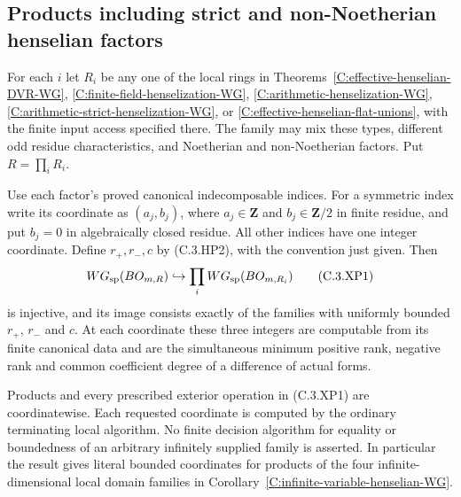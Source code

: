 \subsection{Products including strict and non-Noetherian henselian factors}
\label{C:extended-henselian-products-subsection}

\begin{theorem}
\label{C:extended-henselian-products-WG}
For each $i$ let $R_i$ be any one of the local rings in
Theorems~\ref{C:effective-henselian-DVR-WG},
\ref{C:finite-field-henselization-WG},
\ref{C:arithmetic-henselization-WG},
\ref{C:arithmetic-strict-henselization-WG}, or
\ref{C:effective-henselian-flat-unions}, with the finite
input access specified there.  The family may mix these
types, different odd residue characteristics, and
Noetherian and non-Noetherian factors.  Put $R=\prod_iR_i$.

Use each factor's proved canonical indecomposable indices.
For a symmetric index write its coordinate as $(a_j,b_j)$,
where $a_j\in\mathbf Z$ and $b_j\in\mathbf Z/2$ in
finite residue, and put $b_j=0$ in algebraically closed
residue.  All other indices have one integer coordinate.
Define $r_+,r_-,c$ by (C.3.HP2), with the convention
just given.  Then
\[
 WG_{\rm sp}(BO_{m,R})\hookrightarrow
             \prod_i WG_{\rm sp}(BO_{m,R_i})             \tag{C.3.XP1}
\]
is injective, and its image consists exactly of the
families with uniformly bounded $r_+$, $r_-$ and $c$.
At each coordinate these three integers are computable
from its finite canonical data and are the simultaneous
minimum positive rank, negative rank and common
coefficient degree of a difference of actual forms.

Products and every prescribed exterior operation in
(C.3.XP1) are coordinatewise.  Each requested coordinate
is computed by the ordinary terminating local algorithm.
No finite decision algorithm for equality or boundedness
of an arbitrary infinitely supplied family is asserted.
In particular the result gives literal bounded
coordinates for products of the four infinite-dimensional
local domain families in
Corollary~\ref{C:infinite-variable-henselian-WG}.
\end{theorem}
